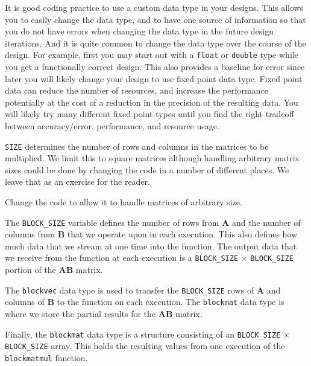 \begin{aside}
It is good coding practice to use a custom data type in your designs. This allows you to easily change the data type, and to have one source of information so that you do not have errors when changing the data type in the future design iterations. And it is quite common to change the data type over the course of the design. For example, first you may start out with a \lstinline{float} or \lstinline{double} type while you get a functionally correct design. This also provides a baseline for error since later you will likely change your design to use fixed point data type.  Fixed point data can reduce the number of resources, and increase the performance potentially at the cost of a reduction in the precision of the resulting data. You will likely try many different fixed point types until you find the right tradeoff between accuracy/error, performance, and resource usage.
\end{aside}

\lstinline{SIZE} determines the number of rows and columns in the matrices to be multiplied. We limit this to square matrices although handling arbitrary matrix sizes could be done by changing the code in a number of different places. We leave that as an exercise for the reader.

\begin{exercise}
Change the code to allow it to handle matrices of arbitrary size. 
\end{exercise}

The \lstinline{BLOCK_SIZE} variable defines the number of rows from $\mathbf{A}$ and the number of columns from $\mathbf{B}$ that we operate upon in each execution. This also defines how much data that we stream at one time into the function. The output data that we receive from the function at each execution is a \lstinline{BLOCK_SIZE} $\times$ \lstinline{BLOCK_SIZE} portion of the $\mathbf{AB}$ matrix. 

The \lstinline{blockvec} data type is used to transfer the \lstinline{BLOCK_SIZE} rows of $\mathbf{A}$ and columns of $\mathbf{B}$ to the function on each execution. The \lstinline{blockmat} data type is where we store the partial results for the $\mathbf{AB}$ matrix. 

Finally, the \lstinline{blockmat} data type is a structure consisting of an \lstinline{BLOCK_SIZE} $\times$ \lstinline{BLOCK_SIZE} array. This holds the resulting values from one execution of the \lstinline{blockmatmul} function. 

